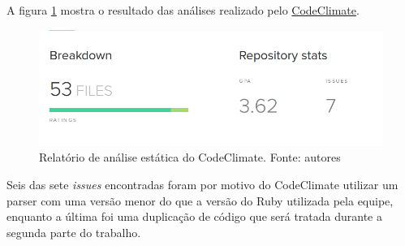 \begin{anexosenv}
A figura \ref{img:codeclimate} mostra o resultado das análises realizado pelo \href{https://codeclimate.com/github/Guimifiu/guimifiu-backend/}{CodeClimate}. 

\begin{figure}[H]
    \centering
    \includegraphics[scale=0.5]{figuras/codeclimate.png}
    \caption[Relatório de análise estática do CodeClimate]{Relatório de análise estática do CodeClimate. Fonte: autores}
    \label{img:codeclimate}
\end{figure}

Seis das sete \textit{issues} encontradas foram por motivo do CodeClimate utilizar um parser com uma versão menor do que a versão do Ruby utilizada pela equipe, enquanto a última foi uma duplicação de código que será tratada durante a segunda parte do trabalho.

\end{anexosenv}
